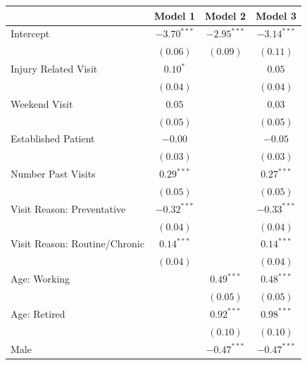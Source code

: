 \documentclass[12pt,twoside]{reedthesis}
\begin{document}
  \begin{table}
  \begin{center}
  \begin{small}
  \begin{tabular}{l c c c }
  \hline
   & Model 1 & Model 2 & Model 3 \\
  \hline
  Intercept                     & $-3.70^{***}$ & $-2.95^{***}$ & $-3.14^{***}$ \\
                                & $(0.06)$      & $(0.09)$      & $(0.11)$      \\
  Injury Related Visit          & $0.10^{*}$    &               & $0.05$        \\
                                & $(0.04)$      &               & $(0.04)$      \\
  Weekend Visit                 & $0.05$        &               & $0.03$        \\
                                & $(0.05)$      &               & $(0.05)$      \\
  Established Patient           & $-0.00$       &               & $-0.05$       \\
                                & $(0.03)$      &               & $(0.03)$      \\
  Number Past Visits            & $0.29^{***}$  &               & $0.27^{***}$  \\
                                & $(0.05)$      &               & $(0.05)$      \\
  Visit Reason: Preventative    & $-0.32^{***}$ &               & $-0.33^{***}$ \\
                                & $(0.04)$      &               & $(0.04)$      \\
  Visit Reason: Routine/Chronic & $0.14^{***}$  &               & $0.14^{***}$  \\
                                & $(0.04)$      &               & $(0.04)$      \\
  Age: Working                  &               & $0.49^{***}$  & $0.48^{***}$  \\
                                &               & $(0.05)$      & $(0.05)$      \\
  Age: Retired                  &               & $0.92^{***}$  & $0.98^{***}$  \\
                                &               & $(0.10)$      & $(0.10)$      \\
  Male                          &               & $-0.47^{***}$ & $-0.47^{***}$ \\

\end{tabular}
\end{small}
\end{center}
\end{table}
\end{document}
